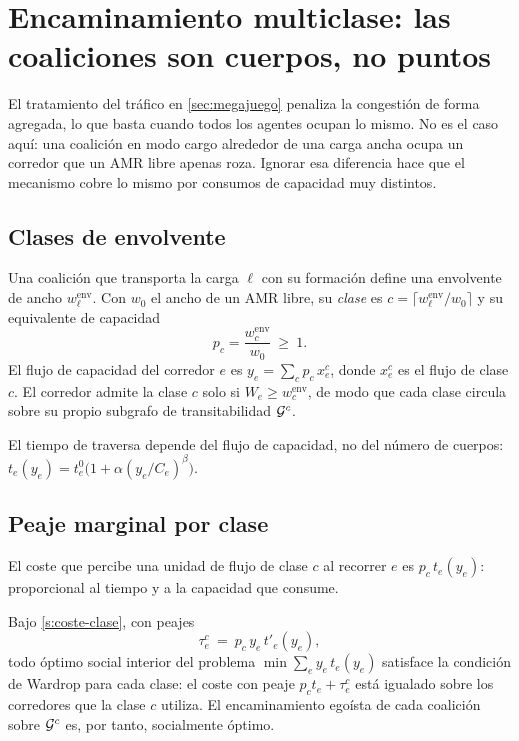 \section{Encaminamiento multiclase: las coaliciones son cuerpos, no puntos}
\label{sec:multiclase}

El tratamiento del tráfico en \cref{sec:megajuego} penaliza la congestión de
forma agregada, lo que basta cuando todos los agentes ocupan lo mismo. No es el
caso aquí: una coalición en modo \textsf{cargo} alrededor de una carga ancha
ocupa un corredor que un AMR libre apenas roza. Ignorar esa diferencia hace que
el mecanismo cobre lo mismo por consumos de capacidad muy distintos.

\subsection{Clases de envolvente}

\begin{definicion}
\label{def:clase}
Una coalición que transporta la carga $\ell$ con su formación define una
envolvente de ancho $w^{\mathrm{env}}_\ell$. Con $w_0$ el ancho de un AMR libre,
su \emph{clase} es $c=\lceil w^{\mathrm{env}}_\ell/w_0\rceil$ y su equivalente de
capacidad
\[
  p_c=\frac{w^{\mathrm{env}}_c}{w_0}\ \ge\ 1 .
\]
El flujo de capacidad del corredor $e$ es $y_e=\sum_c p_c\,x^c_e$, donde $x^c_e$
es el flujo de clase $c$. El corredor admite la clase $c$ solo si
$W_e\ge w^{\mathrm{env}}_c$, de modo que cada clase circula sobre su propio
subgrafo de transitabilidad $\mathcal{G}^c$.
\end{definicion}

El tiempo de traversa depende del flujo de capacidad, no del número de cuerpos:
$t_e(y_e)=t^0_e\bigl(1+\alpha(y_e/C_e)^{\beta}\bigr)$.

\subsection{Peaje marginal por clase}

\begin{supuesto}
\label{s:coste-clase}
El coste que percibe una unidad de flujo de clase $c$ al recorrer $e$ es
$p_c\,t_e(y_e)$: proporcional al tiempo y a la capacidad que consume.
\end{supuesto}

\begin{teorema}
\label{th:multiclase}
Bajo \cref{s:coste-clase}, con peajes
\[
  \tau^c_e\ =\ p_c\,y_e\,t'_e(y_e),
\]
todo óptimo social interior del problema
$\min\sum_e y_e\,t_e(y_e)$ satisface la condición de Wardrop para cada clase:
el coste con peaje $p_c t_e+\tau^c_e$ está igualado sobre los corredores que la
clase $c$ utiliza. El encaminamiento egoísta de cada coalición sobre $\mathcal{G}^c$
es, por tanto, socialmente óptimo.
\end{teorema}

